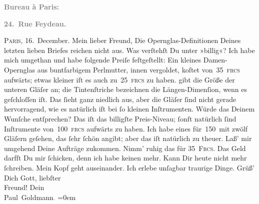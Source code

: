 \begin{ledgroupsized}[t]{13cm}
           \pstart
           \begin{otherlanguage}{french}\textcolor{gray}{\textbf{\textbf{Bureau à Paris:}}}\end{otherlanguage}\pend
           \pstart
           \begin{otherlanguage}{french}\textcolor{gray}{\textbf{\textbf{24. Rue Feydeau.}}}\end{otherlanguage}\hfill \textsc{Paris}, 16. December.\pend
           \pstart\center{}Mein lieber Freund,\pend\pstart
           Die Opernglas-Definitionen Deines letzten lieben Briefes reichen nicht aus. Was
               verſtehſt Du unter »billig«? Ich habe mich umgethan\strikeout{,}
               und habe folgende Preiſe feſtgeſtellt: Ein kleines Damen-Opernglas aus buntfarbigem
               Perlmutter, innen vergoldet, koſtet von 35 \textsc{frcs} aufwärts;
               etwas kleiner iſt es auch zu 25 \textsc{frcs} zu haben. \label{K_L02759-22v}\label{K_L02759-22h} gibt die
               Größe der unteren Gläſer an; die {\pb}Tintenſtriche
               bezeichnen die Längen-Dimenſion, wenn es geſchloſſen iſt. Das ſieht ganz niedlich
               aus, aber die Gläſer ſind nicht gerade hervorragend, wie es natürlich iſt bei ſo
               kleinen Inſtrumenten. Würde das Deinem Wunſche entſprechen? Das iſt das billigſte
               Preis-Niveau; ſonſt natürlich ſind Inſtrumente von 100 \textsc{frcs}
               aufwärts zu haben. Ich habe eines für 150 mit zwölf Gläſern geſehen, das ſehr ſchön
               angibt; aber das iſt {\pb}natürlich zu theuer.\pend
           \pstart
           Laß’ mir umgehend Deine Aufträge zukommen. Nimm’ ruhig das für \textsc{35 Frcs}. Das Geld darfſt Du mir ſchicken, denn ich habe keinen \label{K_L02759-1v}\label{K_L02759-1h} mehr.\pend
           \pstart
           Kann Dir heute nicht mehr ſchreiben. Mein Kopf geht auseinander. Ich erlebe unſagbar
               traurige Dinge.\pend
           \pstart
           Grüß’ Dich Gott, liebſter {\\[\baselineskip]}Freund! Dein {\\[\baselineskip]}\spacefill\mbox{Paul Goldmann\textcolor{gray}{.}}\pend
           \leftskip=0em{}\pstart
           \noindent{}\label{T_L02759-4v}\label{T_L02759-4h}\pend
           
         
         \endnumbering{}\end{ledgroupsized}  \newcommand{\dateiname}{L02759}\newcommand{\titel}{Paul Goldmann an Arthur Schnitzler, 16. 12. [1895]}\newcommand{\editorInnen}{Martin Anton Müller und Laura Untner}
      